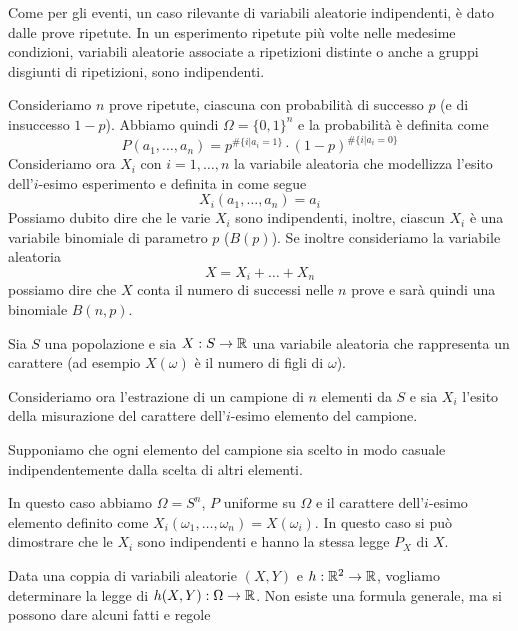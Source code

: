 Come per gli eventi, un caso rilevante di variabili aleatorie indipendenti, è dato dalle prove
ripetute. In un esperimento ripetute più volte nelle medesime condizioni, variabili aleatorie
associate a ripetizioni distinte o anche a gruppi disgiunti di ripetizioni, sono indipendenti.

\begin{example}
	Consideriamo $n$ prove ripetute, ciascuna con probabilità di successo $p$ (e di insuccesso
	$1-p$). Abbiamo quindi $\Omega = \{0,1\}^n$ e la probabilità è definita come
	\[ P(a_1, \dots, a_n) = p^{\# \{i | a_i = 1\}} \cdot (1-p)^{\# \{i | a_i = 0\}} \]
	Consideriamo ora $X_i$ con $i = 1, \dots, n$ la variabile aleatoria che modellizza l'esito
	dell'$i$-esimo esperimento e definita in come segue
	\[ X_i (a_1, \dots, a_n) = a_i \]
	Possiamo dubito dire che le varie $X_i$ sono indipendenti, inoltre, ciascun $X_i$ è una
	variabile binomiale di parametro $p$ ($B(p)$). Se inoltre consideriamo la variabile aleatoria
	\[ X = X_i + \dots + X_n \]
	possiamo dire che $X$ conta il numero di successi nelle $n$ prove e sarà quindi una binomiale
	$B(n,p)$.
\end{example}

\begin{example}
	Sia $S$ una popolazione e sia $X : S \to \mathbb{R}$ una variabile aleatoria che rappresenta un
	carattere (ad esempio $X(\omega)$ è il numero di figli di $\omega$).

	Consideriamo ora l'estrazione di un campione di $n$ elementi da $S$ e sia $X_i$ l'esito della
	misurazione del carattere dell'$i$-esimo elemento del campione.

	Supponiamo che ogni elemento del campione sia scelto in modo casuale indipendentemente dalla
	scelta di altri elementi.

	In questo caso abbiamo $\Omega = S^n$, $P$ uniforme su $\Omega$ e il carattere dell'$i$-esimo
	elemento definito come $X_i(\omega_1, \dots, \omega_n) = X (\omega_i)$. In questo caso si può
	dimostrare che le $X_i$ sono indipendenti e hanno la stessa legge $P_X$ di $X$.
\end{example}

Data una coppia di variabili aleatorie $(X, Y)$ e $h : \mathbb{R}^2 \to \mathbb{R}$, vogliamo determinare la legge
di $h(X, Y) : \Omega \to \mathbb{R}$. Non esiste una formula generale, ma si possono dare alcuni fatti e
regole

